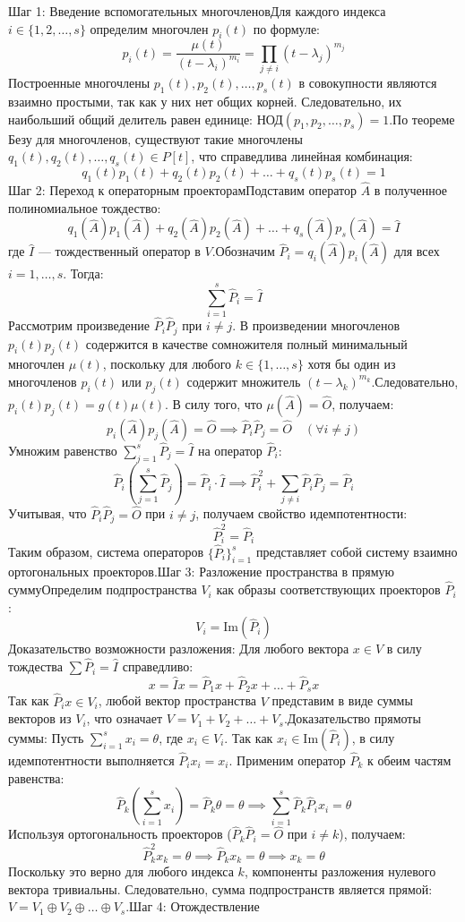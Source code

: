 \documentclass[14pt]{extreport}
\begin{document}
    \begin{prbox}
        Шаг 1: Введение вспомогательных многочленовДля каждого индекса $i \in \{1, 2, \dots, s\}$ определим многочлен $p_i(t)$ по формуле:$$p_i(t) = \frac{\mu(t)}{(t - \lambda_i)^{m_i}} = \prod_{j \neq i} (t - \lambda_j)^{m_j}$$Построенные многочлены $p_1(t), p_2(t), \dots, p_s(t)$ в совокупности являются взаимно простыми, так как у них нет общих корней. Следовательно, их наибольший общий делитель равен единице: $\text{НОД}(p_1, p_2, \dots, p_s) = 1$.По теореме Безу для многочленов, существуют такие многочлены $q_1(t), q_2(t), \dots, q_s(t) \in P[t]$, что справедлива линейная комбинация:$$q_1(t)p_1(t) + q_2(t)p_2(t) + \dots + q_s(t)p_s(t) = 1$$Шаг 2: Переход к операторным проекторамПодставим оператор $\hat{A}$ в полученное полиномиальное тождество:$$q_1(\hat{A})p_1(\hat{A}) + q_2(\hat{A})p_2(\hat{A}) + \dots + q_s(\hat{A})p_s(\hat{A}) = \hat{I}$$где $\hat{I}$ — тождественный оператор в $V$.Обозначим $\hat{P}_i = q_i(\hat{A})p_i(\hat{A})$ для всех $i = 1, \dots, s$. Тогда:$$\sum_{i=1}^s \hat{P}_i = \hat{I}$$Рассмотрим произведение $\hat{P}_i \hat{P}_j$ при $i \neq j$. В произведении многочленов $p_i(t)p_j(t)$ содержится в качестве сомножителя полный минимальный многочлен $\mu(t)$, поскольку для любого $k \in \{1, \dots, s\}$ хотя бы один из многочленов $p_i(t)$ или $p_j(t)$ содержит множитель $(t - \lambda_k)^{m_k}$.Следовательно, $p_i(t)p_j(t) = g(t)\mu(t)$. В силу того, что $\mu(\hat{A}) = \hat{O}$, получаем:$$p_i(\hat{A})p_j(\hat{A}) = \hat{O} \implies \hat{P}_i \hat{P}_j = \hat{O} \quad (\forall i \neq j)$$Умножим равенство $\sum_{j=1}^s \hat{P}_j = \hat{I}$ на оператор $\hat{P}_i$:$$\hat{P}_i \left( \sum_{j=1}^s \hat{P}_j \right) = \hat{P}_i \cdot \hat{I} \implies \hat{P}_i^2 + \sum_{j \neq i} \hat{P}_i \hat{P}_j = \hat{P}_i$$Учитывая, что $\hat{P}_i \hat{P}_j = \hat{O}$ при $i \neq j$, получаем свойство идемпотентности:$$\hat{P}_i^2 = \hat{P}_i$$Таким образом, система операторов $\{\hat{P}_i\}_{i=1}^s$ представляет собой систему взаимно ортогональных проекторов.Шаг 3: Разложение пространства в прямую суммуОпределим подпространства $V_i$ как образы соответствующих проекторов $\hat{P}_i$:$$V_i = \text{Im}(\hat{P}_i)$$Доказательство возможности разложения: Для любого вектора $x \in V$ в силу тождества $\sum \hat{P}_i = \hat{I}$ справедливо:$$x = \hat{I}x = \hat{P}_1 x + \hat{P}_2 x + \dots + \hat{P}_s x$$Так как $\hat{P}_i x \in V_i$, любой вектор пространства $V$ представим в виде суммы векторов из $V_i$, что означает $V = V_1 + V_2 + \dots + V_s$.Доказательство прямоты суммы: Пусть $\sum_{i=1}^s x_i = \theta$, где $x_i \in V_i$. Так как $x_i \in \text{Im}(\hat{P}_i)$, в силу идемпотентности выполняется $\hat{P}_i x_i = x_i$. Применим оператор $\hat{P}_k$ к обеим частям равенства:$$\hat{P}_k \left( \sum_{i=1}^s x_i \right) = \hat{P}_k \theta = \theta \implies \sum_{i=1}^s \hat{P}_k \hat{P}_i x_i = \theta$$Используя ортогональность проекторов ($\hat{P}_k \hat{P}_i = \hat{O}$ при $i \neq k$), получаем:$$\hat{P}_k^2 x_k = \theta \implies \hat{P}_k x_k = \theta \implies x_k = \theta$$Поскольку это верно для любого индекса $k$, компоненты разложения нулевого вектора тривиальны. Следовательно, сумма подпространств является прямой: $V = V_1 \oplus V_2 \oplus \dots \oplus V_s$.Шаг 4: Отождествление 
\end{prbox}
\end{document}
